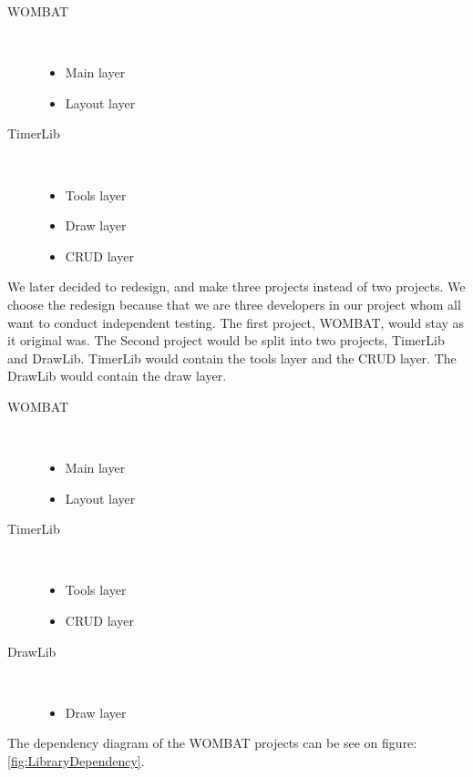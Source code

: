 \begin{description}
  \item[WOMBAT] \hfill \\\begin{itemize}  \item Main layer  \item Layout layer
\end{itemize}
  \item[TimerLib] \hfill \\\begin{itemize}  \item Tools layer  \item Draw layer  \item CRUD layer
\end{itemize}
\end{description}

We later decided to redesign, and make three projects instead of two projects. We choose the redesign because that we are three developers in our project whom all want to conduct independent testing. The first project, WOMBAT, would stay as it original was. The Second project would be split into two projects, TimerLib and DrawLib. TimerLib would contain the tools layer and the CRUD layer. The DrawLib would contain the draw layer.

\begin{description}
  \item[WOMBAT] \hfill \\\begin{itemize}  \item Main layer  \item Layout layer\end{itemize}
  \item[TimerLib] \hfill \\\begin{itemize}  \item Tools layer  \item CRUD layer
\end{itemize}
  \item[DrawLib] \hfill \\\begin{itemize}  \item Draw layer\end{itemize}
\end{description}

The dependency diagram of the WOMBAT projects can be see on figure: \ref{fig:LibraryDependency}.

